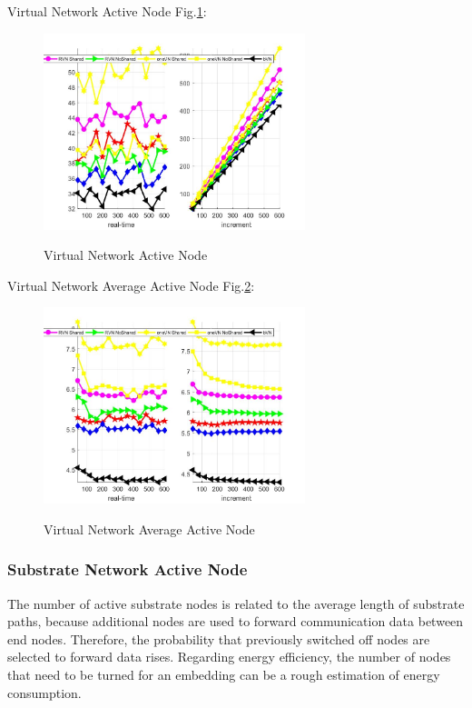 Virtual Network Active Node Fig.\ref{fig:ActiveNodeVirtualNetwork}:
\begin{figure}
  \centering
  \includegraphics[width=3in]{Fig/ActiveNodeVirtualNetwork}\\
  \caption{Virtual Network Active Node}\label{fig:ActiveNodeVirtualNetwork}
\end{figure}

Virtual Network Average Active Node Fig.\ref{fig:ActiveNodeAverageVirtualNetwork}:
\begin{figure}
  \centering
  \includegraphics[width=3in]{Fig/ActiveNodeAverageVirtualNetwork}\\
  \caption{Virtual Network Average Active Node}\label{fig:ActiveNodeAverageVirtualNetwork}
\end{figure}

\subsubsection{Substrate Network Active Node}
The number of active substrate nodes is related to the average length of substrate paths, because additional nodes are used to forward communication data between end nodes. Therefore, the probability that previously switched off nodes are selected to forward data rises. Regarding energy efficiency, the number of nodes that need to be turned for an embedding can be a rough estimation of energy consumption.

